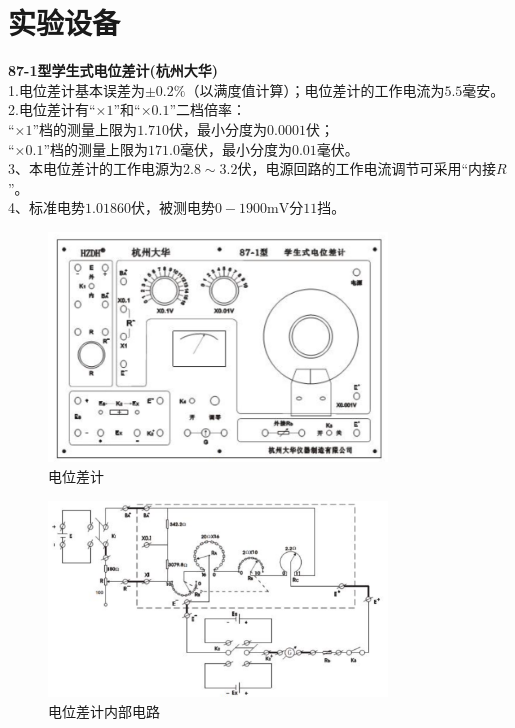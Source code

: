 \documentclass{article}
\begin{document}
\section{实验设备}
\textbf{87-1型学生式电位差计(杭州大华)}\\
\hspace*{1em}1.电位差计基本误差为\(\pm0.2\%\)（以满度值计算）；电位差计的工作电流为\(5.5\)毫安。\\
\hspace*{1em}2.电位差计有“\(\times1\)”和“\(\times0.1\)”二档倍率：\\
\hspace*{2em}“\(\times1\)”档的测量上限为\(1.710\)伏，最小分度为\(0.0001\)伏；\\
\hspace*{2em}“\(\times0.1\)”档的测量上限为\(171.0\)毫伏，最小分度为\(0.01\)毫伏。\\
\hspace*{1em}3、本电位差计的工作电源为\(2.8\sim3.2\)伏，电源回路的工作电流调节可采用“内接\(R\)”。\\
\hspace*{1em}4、标准电势\(1.01860\)伏，被测电势\(0 - 1900\mathrm{mV}\)分\(11\)挡。
\begin{figure}[h]
    \centering
    \includegraphics[width=9cm]{3.1.png} %
    \caption{电位差计}
\end{figure}
\begin{figure}[h]
    \centering
    \includegraphics[width=9cm]{3.2.png} %
    \caption{电位差计内部电路}
\end{figure}
\end{document}
